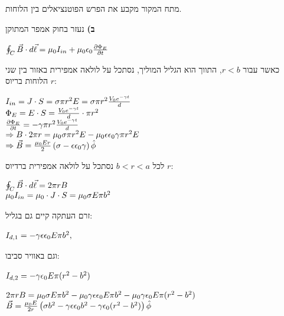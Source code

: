 \documentclass[14pt]{extarticle}
\makeatletter
\newenvironment{lefteqs}{%
    \begin{english}%
    \begin{flushleft}%
    \renewcommand{\arraystretch}{1.3}%
    $\begin{array}{@{}l@{}}%
}{%
    \end{array}$%
    \end{flushleft}%
    \end{english}%
}
\makeatother
\begin{document}
מתח המקור מקבע את הפרש הפוטנציאלים בין הלוחות.

\textbf{ב)} 
נעזר בחוק אמפר המתוקן

\begin{lefteqs}
    \oint_C\vec{B}\cdot d\vec{\ell}=\mu_0I_{in}+\mu_0\epsilon_0\frac{\partial\Phi_E}{\partial t}
\end{lefteqs}

כאשר עבור $r<b$, התווך הוא הגליל המוליך, נסתכל על לולאה אמפירית באזור בין שני הלוחות בריוס $r$:



\begin{lefteqs}
    I_{in}=J \cdot S = \sigma\pi r^2E = \sigma\pi r^2 \frac{V_0e^{-\gamma t}}{d} \\
    \Phi_E = E \cdot S = \frac{V_0e^{-\gamma t}}{d} \cdot \pi r^2 \\
    \frac{\partial\Phi_E}{\partial t}=-\gamma\pi r^2 \frac{V_0e^{-\gamma t}}{d} \\
    \Rightarrow B \cdot 2\pi r = \mu_0\sigma\pi r^2 E - \mu_0\epsilon \epsilon_0\gamma\pi r^2 E \\
    \Rightarrow \vec{B} = \frac{\mu_0 E r}{2} \left( \sigma - \epsilon \epsilon_0 \gamma \right) \hat{\phi}
\end{lefteqs}


לכל $b<r<a$ נסתכל על לולאה אמפירית ברדיוס $r$:
\begin{lefteqs}
    \oint_C \vec{B}\cdot d\vec{\ell} = 2\pi r B \\
    \mu_0 I_{in} = \mu_0 \cdot J \cdot S = \mu_0 \sigma E \pi b^2
\end{lefteqs}

זרם העתקה קיים גם בגליל:

\begin{lefteqs}
    I_{d,1}=-\gamma\epsilon\epsilon_0E\pi b^2,
\end{lefteqs}

וגם באוויר סביבו:
\begin{lefteqs}
    I_{d,2}=-\gamma\epsilon_0E\pi(r^2-b^2)
\end{lefteqs}

\begin{lefteqs}
    2\pi rB
    =\mu_0\sigma E\pi b^2-\mu_0 \gamma \epsilon \epsilon_0 E \pi b^2 - \mu_0 \gamma \epsilon_0 E \pi (r^2 - b^2) \\
    \vec{B} = \frac{\mu_0 E}{2r} \left( \sigma b^2 - \gamma \epsilon \epsilon_0 b^2 - \gamma \epsilon_0 (r^2 - b^2) \right) \hat{\phi}
\end{lefteqs}
\end{document}
